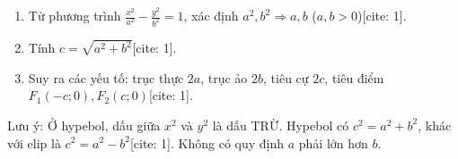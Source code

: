 \begin{enumerate}
\item Từ phương trình $\frac{x^2}{a^2} - \frac{y^2}{b^2} = 1$, xác định $a^2, b^2 \Rightarrow a, b$ ($a, b > 0$)[cite: 1].
\item Tính $c = \sqrt{a^2 + b^2}$[cite: 1].
\item Suy ra các yếu tố: trục thực $2a$, trục ảo $2b$, tiêu cự $2c$, tiêu điểm $F_1(-c; 0), F_2(c; 0)$[cite: 1].
\end{enumerate}
Lưu ý: Ở hypebol, dấu giữa $x^2$ và $y^2$ là dấu TRỪ. Hypebol có $c^2 = a^2 + b^2$, khác với elip là $c^2 = a^2 - b^2$[cite: 1]. Không có quy định $a$ phải lớn hơn $b$.
